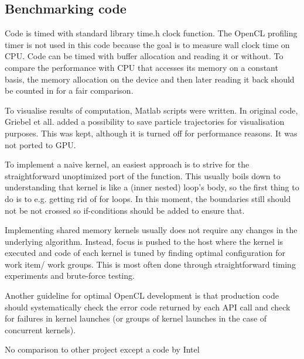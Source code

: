 \subsection{Benchmarking code}
Code is timed with standard library time.h clock function. The OpenCL profiling timer is not used in this code because the goal is to measure wall clock time on CPU. Code can be timed with buffer allocation and reading it or without. To compare the performance with CPU that accesses its memory on a constant basis, the memory allocation on the device and then later reading it back should be counted in for a fair comparison.

To visualise results of computation, Matlab scripts were written. In original code, Griebel et all. added a possibility to save particle trajectories for visualisation purposes. This was kept, although it is turned off for performance reasons. It was not ported to GPU.

To implement a naive kernel, an easiest approach is to strive for the straightforward unoptimized port of the function. This usually boils down to understanding that kernel is like a (inner nested) loop's body, so the first thing to do is to e.g. getting rid of for loops. In this moment, the boundaries still should not be not crossed so if-conditions should be added to ensure that.

Implementing shared memory kernels usually does not require any changes in the underlying algorithm. Instead, focus is pushed to the host where the kernel is executed and code of each kernel is tuned by finding optimal configuration for work item/ work groups. This is most often done through straightforward timing experiments and brute-force testing.

Another guideline for optimal OpenCL development is that production code should systematically check the error code returned by each API call and check for failures in kernel launches (or groups of kernel launches in the case of concurrent kernels). 

No comparison to other project except a code by Intel\cite{intel2012fluid}
